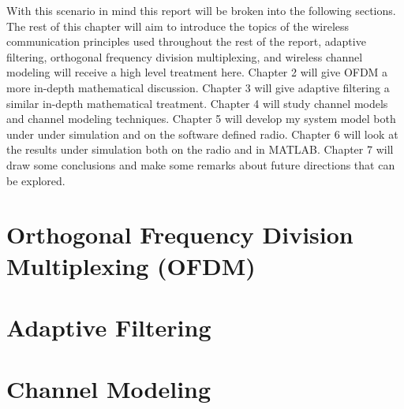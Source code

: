 With this scenario in mind this report will be broken %
into the following sections. The rest of this chapter %
will aim to introduce the topics of the wireless %
communication principles used throughout the rest %
of the report, adaptive filtering, orthogonal %
frequency division multiplexing, and wireless %
channel modeling will receive a high level treatment %
here. Chapter 2 will give OFDM a more in-depth %
mathematical discussion. %
Chapter 3 will give adaptive filtering a similar %
in-depth mathematical treatment. Chapter 4 will study %
channel models and channel modeling techniques. %
Chapter 5 will develop my system model both under %
under simulation and on the software defined radio. %
Chapter 6 will look at the results under simulation %
both on the radio and in MATLAB. Chapter 7 will draw %
some conclusions and make some remarks about future %
directions that can be explored.

\section{Orthogonal Frequency Division Multiplexing %
(OFDM)}

\section{Adaptive Filtering}

\section{Channel Modeling}

